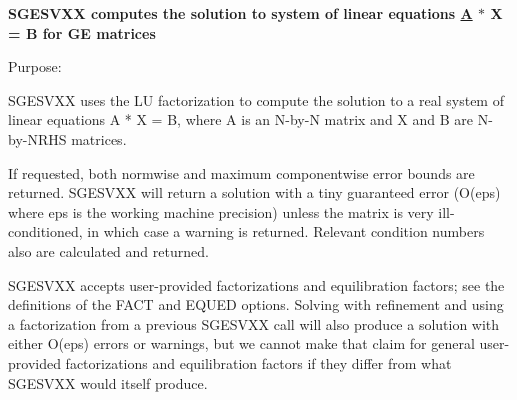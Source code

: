 {\bfseries  S\+G\+E\+S\+V\+X\+X computes the solution to system of linear equations \hyperlink{classA}{A} $\ast$ X = B for G\+E matrices} 

 \begin{DoxyParagraph}{Purpose\+: }
\begin{DoxyVerb}    SGESVXX uses the LU factorization to compute the solution to a
    real system of linear equations  A * X = B,  where A is an
    N-by-N matrix and X and B are N-by-NRHS matrices.

    If requested, both normwise and maximum componentwise error bounds
    are returned. SGESVXX will return a solution with a tiny
    guaranteed error (O(eps) where eps is the working machine
    precision) unless the matrix is very ill-conditioned, in which
    case a warning is returned. Relevant condition numbers also are
    calculated and returned.

    SGESVXX accepts user-provided factorizations and equilibration
    factors; see the definitions of the FACT and EQUED options.
    Solving with refinement and using a factorization from a previous
    SGESVXX call will also produce a solution with either O(eps)
    errors or warnings, but we cannot make that claim for general
    user-provided factorizations and equilibration factors if they
    differ from what SGESVXX would itself produce.\end{DoxyVerb}
 
\end{DoxyParagraph}
